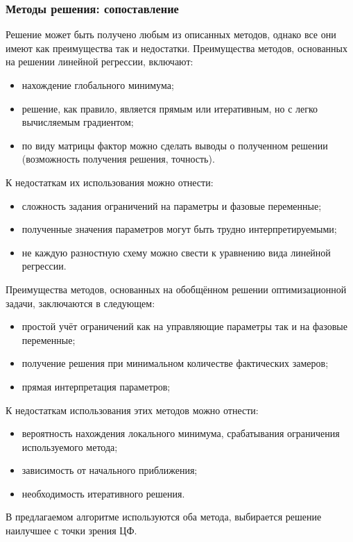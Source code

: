 \documentclass[14pt]{article}
\begin{document}
\subsubsection{Методы решения: сопоставление}
Решение может быть получено любым из описанных методов, однако все они имеют как преимущества так и недостатки. 
Преимущества методов, основанных на решении линейной регрессии, включают:
\begin{itemize}
	\item нахождение глобального минимума;
	\item решение, как правило, является прямым или итеративным, но с легко вычисляемым градиентом;
	\item по виду матрицы фактор можно сделать выводы о полученном решении (возможность получения решения, точность).
\end{itemize}

К недостаткам их использования можно отнести:
\begin{itemize}
 	\item сложность задания ограничений на параметры и фазовые переменные;
 	\item полученные значения параметров могут быть трудно интерпретируемыми;
 	\item не каждую разностную схему можно свести к уравнению вида линейной регрессии.
\end{itemize}


Преимущества методов, основанных на обобщённом решении оптимизационной задачи, заключаются в следующем:
\begin{itemize}
	\item простой учёт ограничений как на управляющие параметры так и на фазовые переменные;
	\item получение решения при минимальном количестве фактических замеров;
	\item прямая интерпретация параметров;
\end{itemize}

К недостаткам использования этих методов можно отнести:
\begin{itemize}
	\item вероятность нахождения локального минимума, срабатывания ограничения используемого метода;
	\item зависимость от начального приближения;
	\item необходимость итеративного решения. 
\end{itemize}
В предлагаемом алгоритме используются оба метода, выбирается решение наилучшее с точки зрения ЦФ. 
\end{document}
